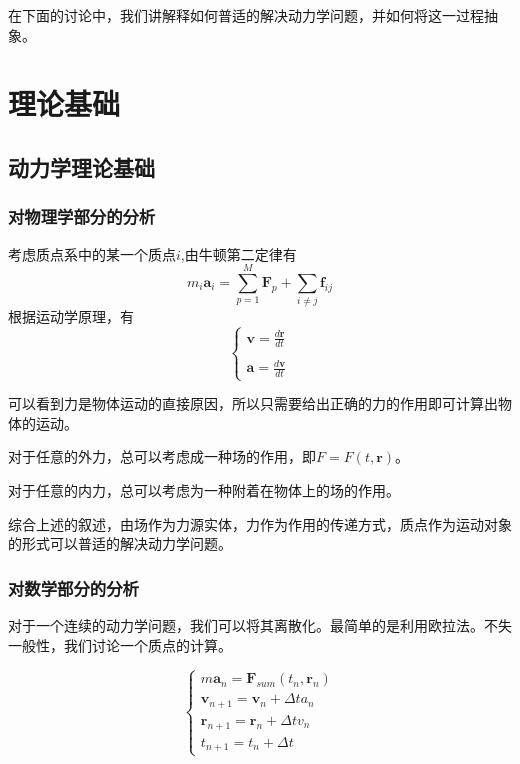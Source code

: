 在下面的讨论中，我们讲解释如何普适的解决动力学问题，并如何将这一过程抽象。

\newpage

\section{理论基础}

\subsection{动力学理论基础}
\subsubsection{对物理学部分的分析}
\noindent 
考虑质点系中的某一个质点$i$,由牛顿第二定律有
\[
    m_{i}\bm{a}_i = \sum_{p=1}^{M}{\bm{F}_p} + \sum_{i \neq j } \bm{f}_{ij}
\]
根据运动学原理，有
\[
    \left\{
        \begin{array}{l}
            {\displaystyle \bm{v} = \frac{d\bm{r}}{dt}}\\
            \\
            {\displaystyle \bm{a} = \frac{d\bm{v}}{dt}}
        \end{array}
    \right.
\]


可以看到力是物体运动的直接原因，所以只需要给出正确的力的作用即可计算出物体的运动。

对于任意的外力，总可以考虑成一种场的作用，即$F = F(t,\bm{r})$。

对于任意的内力，总可以考虑为一种附着在物体上的场的作用。

综合上述的叙述，由场作为力源实体，力作为作用的传递方式，质点作为运动对象的形式可以普适的解决动力学问题。

\subsubsection{对数学部分的分析}
对于一个连续的动力学问题，我们可以将其离散化。最简单的是利用欧拉法。不失一般性，我们讨论一个质点的计算。

\[
    \left\{
        \begin{array}{l}
            {\displaystyle m\bm{a}_{n} = \bm{F}_{sum}(t_n,\bm{r}_n)}
            \\
            {\displaystyle \bm{v}_{n+1} = \bm{v}_{n} + \Delta t a_n }
            \\
            {\displaystyle \bm{r}_{n+1} = \bm{r}_{n} + \Delta t v_n  }
            \\
            {\displaystyle t_{n+1} = t_n + \Delta t}
        \end{array}
    \right.
\]\label{eular}

